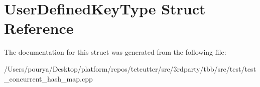 \hypertarget{structUserDefinedKeyType}{}\section{User\+Defined\+Key\+Type Struct Reference}
\label{structUserDefinedKeyType}


The documentation for this struct was generated from the following file\+:\begin{DoxyCompactItemize}
\item 
/\+Users/pourya/\+Desktop/platform/repos/tetcutter/src/3rdparty/tbb/src/test/test\+\_\+concurrent\+\_\+hash\+\_\+map.\+cpp\end{DoxyCompactItemize}
